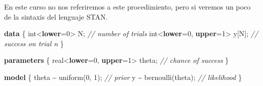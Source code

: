 \documentclass[
  12pt,
]{book}
\newenvironment{Shaded}{\begin{snugshade}}{\end{snugshade}}
\newcommand{\AttributeTok}[1]{\textcolor[rgb]{0.77,0.63,0.00}{#1}}
\newcommand{\CommentTok}[1]{\textcolor[rgb]{0.56,0.35,0.01}{\textit{#1}}}
\newcommand{\DataTypeTok}[1]{\textcolor[rgb]{0.13,0.29,0.53}{#1}}
\newcommand{\DecValTok}[1]{\textcolor[rgb]{0.00,0.00,0.81}{#1}}
\newcommand{\FunctionTok}[1]{\textcolor[rgb]{0.00,0.00,0.00}{#1}}
\newcommand{\KeywordTok}[1]{\textcolor[rgb]{0.13,0.29,0.53}{\textbf{#1}}}
\newcommand{\NormalTok}[1]{#1}
\newcommand{\OtherTok}[1]{\textcolor[rgb]{0.56,0.35,0.01}{#1}}
\newcommand{\SpecialCharTok}[1]{\textcolor[rgb]{0.00,0.00,0.00}{#1}}
\theoremstyle{definition}
\theoremstyle{definition}
\theoremstyle{definition}
\theoremstyle{definition}
\theoremstyle{remark}
\begin{document}
En este curso no nos referiremos a este procedimiento, pero si veremos un poco de la sintaxis del lenguaje STAN.

\begin{Shaded}
\begin{Highlighting}[]
\KeywordTok{data}\NormalTok{ \{}
  \DataTypeTok{int}\NormalTok{\textless{}}\KeywordTok{lower}\NormalTok{=}\DecValTok{0}\NormalTok{\textgreater{} N;               }\CommentTok{// number of trials}
  \DataTypeTok{int}\NormalTok{\textless{}}\KeywordTok{lower}\NormalTok{=}\DecValTok{0}\NormalTok{, }\KeywordTok{upper}\NormalTok{=}\DecValTok{1}\NormalTok{\textgreater{} y[N];   }\CommentTok{// success on trial n}
\NormalTok{\}}

\KeywordTok{parameters}\NormalTok{ \{}
  \DataTypeTok{real}\NormalTok{\textless{}}\KeywordTok{lower}\NormalTok{=}\DecValTok{0}\NormalTok{, }\KeywordTok{upper}\NormalTok{=}\DecValTok{1}\NormalTok{\textgreater{} theta; }\CommentTok{// chance of success}
\NormalTok{\}}

\KeywordTok{model}\NormalTok{ \{}
\NormalTok{  theta \textasciitilde{} uniform(}\DecValTok{0}\NormalTok{, }\DecValTok{1}\NormalTok{);        }\CommentTok{// prior}
\NormalTok{  y \textasciitilde{} bernoulli(theta);         }\CommentTok{// likelihood}
\NormalTok{\}}
\end{Highlighting}
\end{Shaded}

\begin{Shaded}
\end{Shaded}
\end{document}
